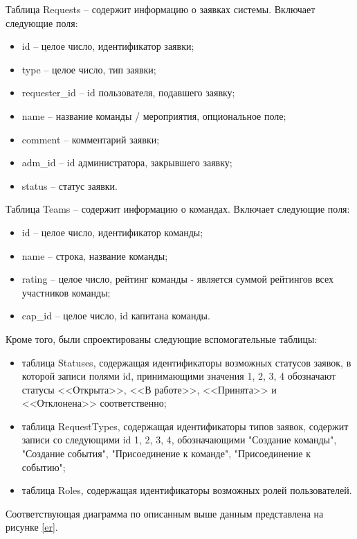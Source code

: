	     Таблица Requests -- содержит информацию о заявках системы. Включает следующие поля:
	\begin{itemize}
		\item id -- целое число, идентификатор заявки;
		\item type -- целое число, тип заявки; 
		\item requester\_id -- id пользователя, подавшего заявку;
		\item name -- название команды / мероприятия, опциональное поле;
		\item comment -- комментарий заявки;
		\item adm\_id -- id администратора, закрывшего заявку;
		\item status -- статус заявки.
	\end{itemize}
 
	 Таблица Teams -- содержит информацию о командах. Включает следующие поля:
	\begin{itemize}
		\item id -- целое число, идентификатор команды;
		\item name -- строка, название команды;
            \item rating -- целое число, рейтинг команды - является суммой рейтингов всех участников команды;
            \item cap\_id -- целое число, id капитана команды.
	\end{itemize}

    Кроме того, были спроектированы следующие вспомогательные таблицы: 
    \begin{itemize}
        \item таблица Statuses, содержащая идентификаторы возможных статусов заявок, в которой записи полями id,
        принимающими значения 1, 2, 3, 4 обозначают статусы <<Открыта>>, <<В работе>>, <<Принята>> и <<Отклонена>> соответственно;
        \item таблица RequestTypes, содержащая идентификаторы типов заявок, содержит записи со следующими id 1, 2, 3, 4, обозначающими "Создание команды", "Создание события", "Присоединение к команде", "Присоединение к событию";
        \item таблица Roles, содержащая идентификаторы возможных ролей пользователей.
    \end{itemize}

    
Соответствующая диаграмма по описанным выше данным представлена на рисунке \ref{er}.

